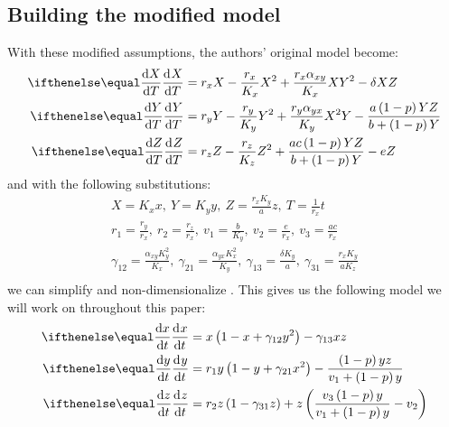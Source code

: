 \subsection{Building the modified model}\label{subsec:modified_model}
With these modified assumptions, the authors' original model become:
\begin{subequations}
    \begin{align}
        \diff[]{X}{T} &= r_xX-\frac{r_x}{K_x}X^2+\frac{r_x\alpha_{xy}}{K_x}XY^2-\delta XZ
        \label{model:3.1a}\\
        \diff[]{Y}{T} &= r_yY-\frac{r_y}{K_y}Y^2+\frac{r_y\alpha_{yx}}{K_y}X^2Y-\frac{a\left(1-p\right)YZ}{b+\left(1-p\right)Y}
        \label{model:3.1b}\\
        \diff[]{Z}{T} &= r_zZ-\frac{r_z}{K_z}Z^2+\frac{ac\left(1-p\right)YZ}{b+\left(1-p\right)Y}-eZ
        \label{model:3.1c}
    \end{align}
    \label{model:3.1}
\end{subequations}
and with the following substitutions:
\begin{gather*}
    X=K_xx,\ Y=K_yy,\ Z=\frac{r_xK_y}{a}z,\ T=\frac{1}{r_x}t\\
    r_1=\frac{r_y}{r_x},\ r_2=\frac{r_z}{r_x},\ v_1=\frac{b}{K_y},\ v_2=\frac{e}{r_x},\ v_3=\frac{ac}{r_x}\\
    \gamma_{12}=\frac{\alpha_{xy}K_y^2}{K_x},\ \gamma_{21}=\frac{\alpha_{yx}K_x^2}{K_y},\ \gamma_{13}=\frac{\delta K_y}{a},\ \gamma_{31}=\frac{r_xK_y}{aK_z}\\
\end{gather*}
we can simplify and non-dimensionalize . This gives us the following model we will work on throughout this paper:
\begin{subequations}
    \begin{align}
        \diff[]{x}{t} &= x\left(1-x+\gamma_{12}y^2\right)-\gamma_{13}xz
        \label{model:3.2a}\\
        \diff[]{y}{t} &= r_1y\left(1-y+\gamma_{21}x^2\right)-\frac{\left(1-p\right)yz}{v_1+\left(1-p\right)y}
        \label{model:3.2b}\\
        \diff[]{z}{t} &= r_2z\left(1-\gamma_{31}z\right)+z\left(\frac{v_3\left(1-p\right)y}{v_1+\left(1-p\right)y}-v_2\right)
        \label{model:3.2c}
    \end{align}
    \label{model:3.2}
\end{subequations}

